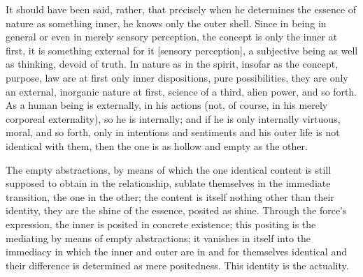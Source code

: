 It should have been said, rather,
that precisely when he determines
the essence of nature as something inner,
he knows only the outer shell.
Since in being in general
or even in merely sensory perception,
the concept is only the inner at first,
it is something external for it [sensory perception],
a subjective being as well as thinking, devoid of truth.
In nature as in the spirit, insofar as
the concept, purpose, law are at first
only inner dispositions, pure possibilities,
they are only an external, inorganic nature at first,
science of a third, alien power, and so forth.
As a human being is externally, in his actions
(not, of course, in his merely corporeal externality),
so he is internally;
and if he is only internally virtuous, moral, and so forth,
only in intentions and sentiments
and his outer life is not identical with them,
then the one is as hollow and empty as the other.

The empty abstractions, by means of which
the one identical content is still supposed
to obtain in the relationship,
sublate themselves in the immediate transition,
the one in the other;
the content is itself nothing other than their identity,
they are the shine of the essence, posited as shine.
Through the force's expression, the inner is posited in concrete existence;
this positing is the mediating by means of empty abstractions;
it vanishes in itself into the immediacy in which
the inner and outer are in and for themselves identical and
their difference is determined as mere positedness.
This identity is the actuality.
